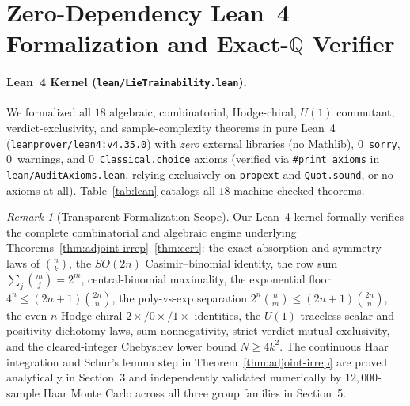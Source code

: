 \documentclass[11pt,a4paper]{article}
\theoremstyle{definition}
\theoremstyle{remark}
\newtheorem{remark}[theorem]{Remark}
\newcommand{\QQ}{\mathbb{Q}}
\begin{document}
\section{Zero-Dependency Lean~4 Formalization and Exact-\texorpdfstring{$\QQ$}{Q} Verifier}

\paragraph{Lean~4 Kernel (\texttt{lean/LieTrainability.lean}).}
We formalized all $18$ algebraic, combinatorial, Hodge-chiral, $U(1)$ commutant, verdict-exclusivity, and sample-complexity theorems in pure Lean~4~\cite{demoura2021lean4} (\texttt{leanprover/lean4:v4.35.0}) with \emph{zero} external libraries (no Mathlib), $0$~\texttt{sorry}, $0$~warnings, and $0$~\texttt{Classical.choice} axioms (verified via \texttt{\#print axioms} in \texttt{lean/AuditAxioms.lean}, relying exclusively on \texttt{propext} and \texttt{Quot.sound}, or no axioms at all). Table~\ref{tab:lean} catalogs all $18$ machine-checked theorems.

\begin{remark}[Transparent Formalization Scope]
Our Lean~4 kernel formally verifies the complete combinatorial and algebraic engine underlying Theorems~\ref{thm:adjoint-irrep}--\ref{thm:cert}: the exact absorption and symmetry laws of $\binom{n}{k}$, the $SO(2n)$ Casimir--binomial identity, the row sum $\sum_j \binom{m}{j} = 2^m$, central-binomial maximality, the exponential floor $4^n \le (2n+1)\binom{2n}{n}$, the poly-vs-exp separation $2^n\binom{n}{m} \le (2n+1)\binom{2n}{n}$, the even-$n$ Hodge-chiral $2\times/0\times/1\times$ identities, the $U(1)$ traceless scalar and positivity dichotomy laws, sum nonnegativity, strict verdict mutual exclusivity, and the cleared-integer Chebyshev lower bound $N \ge 4k^2$. The continuous Haar integration and Schur's lemma step in Theorem~\ref{thm:adjoint-irrep} are proved analytically in Section~3 and independently validated numerically by $12{,}000$-sample Haar Monte Carlo across all three group families in Section~5.
\end{remark}
\end{document}
